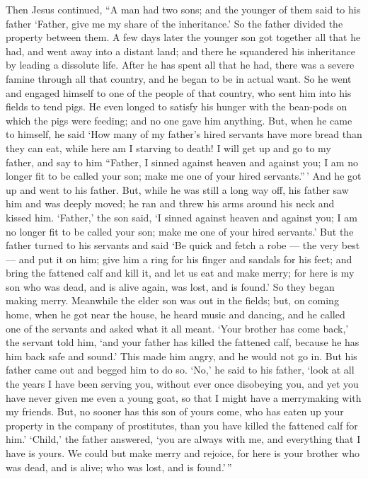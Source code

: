  Then Jesus continued, ``A man had two sons; 
and the younger of them said to his father `Father, give me my share of
the inheritance.' So the father divided the property between them.
 A few days later the younger son got together all that he
had, and went away into a distant land; and there he squandered his
inheritance by leading a dissolute life.  After he has
spent all that he had, there was a severe famine through all that
country, and he began to be in actual want.  So he went and
engaged himself to one of the people of that country, who sent him into
his fields to tend pigs.  He even longed to satisfy his
hunger with the bean-pods on which the pigs were feeding; and no one
gave him anything.  But, when he came to himself, he said
`How many of my father's hired servants have more bread than they can
eat, while here am I starving to death!  I will get up and
go to my father, and say to him ``Father, I sinned against heaven and
against you;  I am no longer fit to be called your son;
make me one of your hired servants.''\,'  And he got up and
went to his father. But, while he was still a long way off, his father
saw him and was deeply moved; he ran and threw his arms around his neck
and kissed him.  `Father,' the son said, `I sinned against
heaven and against you; I am no longer fit to be called your son; make
me one of your hired servants.'  But the father turned to
his servants and said `Be quick and fetch a robe --- the very best ---
and put it on him; give him a ring for his finger and sandals for his
feet;  and bring the fattened calf and kill it, and let us
eat and make merry;  for here is my son who was dead, and
is alive again, was lost, and is found.' So they began making merry.
 Meanwhile the elder son was out in the fields; but, on
coming home, when he got near the house, he heard music and dancing,
 and he called one of the servants and asked what it all
meant.  `Your brother has come back,' the servant told him,
`and your father has killed the fattened calf, because he has him back
safe and sound.'  This made him angry, and he would not go
in. But his father came out and begged him to do so.  `No,'
he said to his father, `look at all the years I have been serving you,
without ever once disobeying you, and yet you have never given me even a
young goat, so that I might have a merrymaking with my friends.
 But, no sooner has this son of yours come, who has eaten
up your property in the company of prostitutes, than you have killed the
fattened calf for him.'  `Child,' the father answered, `you
are always with me, and everything that I have is yours. 
We could but make merry and rejoice, for here is your brother who was
dead, and is alive; who was lost, and is found.'\,''

